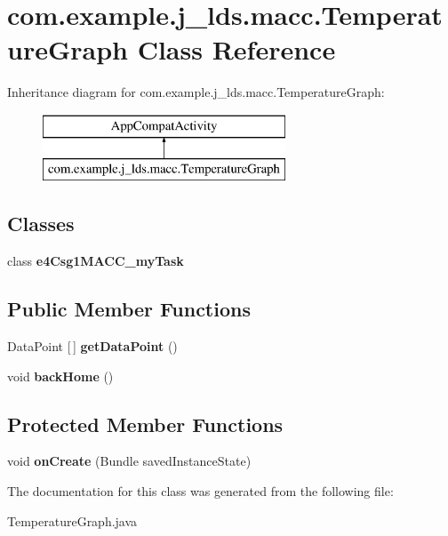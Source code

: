 \hypertarget{classcom_1_1example_1_1j__lds_1_1macc_1_1_temperature_graph}{}\section{com.\+example.\+j\+\_\+lds.\+macc.\+Temperature\+Graph Class Reference}
\label{classcom_1_1example_1_1j__lds_1_1macc_1_1_temperature_graph}
Inheritance diagram for com.\+example.\+j\+\_\+lds.\+macc.\+Temperature\+Graph\+:\begin{figure}[H]
\begin{center}
\leavevmode
\includegraphics[height=2.000000cm]{classcom_1_1example_1_1j__lds_1_1macc_1_1_temperature_graph}
\end{center}
\end{figure}
\subsection*{Classes}
\begin{DoxyCompactItemize}
\item 
class {\bfseries e4\+Csg1\+M\+A\+C\+C\+\_\+my\+Task}
\end{DoxyCompactItemize}
\subsection*{Public Member Functions}
\begin{DoxyCompactItemize}
\item 
\mbox{\label{classcom_1_1example_1_1j__lds_1_1macc_1_1_temperature_graph_aecd489a18fb620f05878526d1b903578}} 
Data\+Point \mbox{[}$\,$\mbox{]} {\bfseries get\+Data\+Point} ()
\item 
\mbox{\label{classcom_1_1example_1_1j__lds_1_1macc_1_1_temperature_graph_a82f17820dd387201db287d74bf1968b7}} 
void {\bfseries back\+Home} ()
\end{DoxyCompactItemize}
\subsection*{Protected Member Functions}
\begin{DoxyCompactItemize}
\item 
\mbox{\label{classcom_1_1example_1_1j__lds_1_1macc_1_1_temperature_graph_a725657d4ff9d5c93aad83343b01f304d}} 
void {\bfseries on\+Create} (Bundle saved\+Instance\+State)
\end{DoxyCompactItemize}


The documentation for this class was generated from the following file\+:\begin{DoxyCompactItemize}
\item 
Temperature\+Graph.\+java\end{DoxyCompactItemize}

